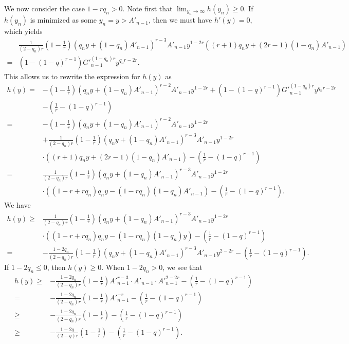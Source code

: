 \documentclass[11pt]{amsart}
\numberwithin{equation}{section}
\theoremstyle{definition}
\theoremstyle{remark}
\begin{document}
   We now consider the case $1-rq_n>0$. Note first that $\lim_{y_n \rightarrow \infty}h(y_n) \geq 0$. If $h(y_n)$ is minimized as some $y_n=y > A'_{n-1}$, then we must have $h'(y)=0$, which yields
\begin{align*}
  & \frac 1{(2-q_n)r}(1-\frac {1}{r})(q_ny+(1-q_n)A'_{n-1})^{r-3}A'_{n-1}y^{1-2r}\left ( \left (r+1 \right )q_ny+\left ( 2r-1 \right )\left ( 1-q_n\right )A'_{n-1}\right) \\
=& (1-(1-q)^{r-1}){G'}^{(1-	q_n)r}_{n-1}y^{q_nr-2r}.
\end{align*}
   This allows us to rewrite the expression for $h(y)$ as
 \begin{align}
\label{2.2}
  h(y) =&  -(1-\frac {1}{r})(q_ny+(1-q_n)A'_{n-1})^{r-2}A'_{n-1}y^{1-2r}+(1-(1-q)^{r-1}){G'}^{(1-	q_n)r}_{n-1}y^{q_nr-2r} \\
& -(\frac 1r-(1-q)^{r-1}) \nonumber\\
=& -(1-\frac {1}{r})(q_ny+(1-q_n)A'_{n-1})^{r-2}A'_{n-1}y^{1-2r} \nonumber \\
&+\frac 1{(2-q_n)r}(1-\frac {1}{r})(q_ny+(1-q_n)A'_{n-1})^{r-3}A'_{n-1}y^{1-2r} \nonumber \\
& \cdot \left ( \left (r+1 \right )q_ny+\left ( 2r-1 \right )\left ( 1-q_n\right )A'_{n-1}\right)-(\frac 1r-(1-q)^{r-1}) \nonumber \\
 =& \frac 1{(2-q_n)r}(1-\frac {1}{r})(q_ny+(1-q_n)A'_{n-1})^{r-3}A'_{n-1}y^{1-2r} \nonumber \\
 & \cdot \left ( \left (1-r+rq_n\right)q_ny- \left (1-rq_n \right) \left (1-q_n \right)A'_{n-1}\right ) -(\frac 1r-(1-q)^{r-1}). \nonumber
\end{align}
   We have
\begin{align*}
   h(y) \geq & \frac 1{(2-q_n)r}(1-\frac {1}{r})(q_ny+(1-q_n)A'_{n-1})^{r-3}A'_{n-1}y^{1-2r} \\
   & \cdot \left ( \left (1-r+rq_n\right)q_ny- \left (1-rq_n \right)\left (1-q_n \right)y \right )-(\frac 1r-(1-q)^{r-1}) \\
=& -\frac {1-2q_n}{(2-q_n)r}(1-\frac {1}{r})(q_ny+(1-q_n)A'_{n-1})^{r-3}A'_{n-1}y^{2-2r} -(\frac 1r-(1-q)^{r-1}).
\end{align*}
   If $1-2q_n \leq 0$, then $h(y) \geq 0$. When $1-2q_n>0$, we see that
\begin{align*}
   h(y) \geq & -\frac {1-2q_n}{(2-q_n)r}(1-\frac {1}{r}){A'}^{r-3}_{n-1}\cdot A'_{n-1} \cdot {A'}^{2-2r}_{n-1} -(\frac 1r-(1-q)^{r-1}) \\
=&  -\frac {1-2q_n}{(2-q_n)r}(1-\frac {1}{r}){A'}^{-r}_{n-1}-(\frac 1r-(1-q)^{r-1}) \\
\geq & -\frac {1-2q_n}{(2-q_n)r}(1-\frac {1}{r})-(\frac 1r-(1-q)^{r-1}) \\
\geq & -\frac {1-2q}{(2-q)r}(1-\frac {1}{r})-(\frac 1r-(1-q)^{r-1}).
\end{align*}
\end{document}
